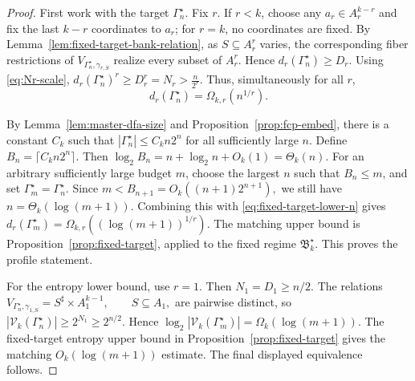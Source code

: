 \documentclass[11pt]{article}
\theoremstyle{definition}
\theoremstyle{remark}
\begin{document}
\begin{proof}
First work with the target \(\Gamma_n^\star\).
Fix \(r\).  If \(r<k\), choose any
\(a_r\in A_r^{k-r}\)
and fix the last \(k-r\) coordinates to \(a_r\); for \(r=k\), no coordinates
are fixed.  By Lemma~\ref{lem:fixed-target-bank-relation}, as
\(S\subseteq A_r^r\)
varies, the corresponding fiber restrictions of
\(V_{\Gamma_n^\star,\gamma_{r,S}}\) realize every subset of \(A_r^r\).
Hence
\(d_r(\Gamma_n^\star)\ge D_r.\)
Using \eqref{eq:Nr-scale},
\(d_r(\Gamma_n^\star)^r \ge D_r^r = N_r > \frac{n}{2^r}.\)
Thus, simultaneously for all \(r\),
\begin{equation}
\label{eq:fixed-target-lower-n}
d_r(\Gamma_n^\star)
=
\Omega_{k,r}(n^{1/r}).
\end{equation}

By Lemma~\ref{lem:master-dfa-size} and
Proposition~\ref{prop:fcp-embed}, there is a constant \(C_k\) such that
\(|\Gamma_n^\star| \le C_k n2^n\)
for all sufficiently large \(n\).  Define
\(B_n=\lceil C_k n2^n\rceil.\)
Then
\(\log_2 B_n = n+\log_2 n+O_k(1) = \Theta_k(n).\)
For an arbitrary sufficiently large budget \(m\), choose the largest \(n\)
such that \(B_n\le m\), and set
\(\Gamma_m^\star=\Gamma_n^\star.\)
Since
\(m<B_{n+1} = O_k((n+1)2^{n+1}),\)
we still have
\(n=\Theta_k(\log(m+1)).\)
Combining this with \eqref{eq:fixed-target-lower-n} gives
\(d_r(\Gamma_m^\star) = \Omega_{k,r} \!\left((\log(m+1))^{1/r}\right).\)
The matching upper bound is Proposition~\ref{prop:fixed-target}, applied to
the fixed regime \(\mathfrak B_k^\star\).  This proves the profile statement.

For the entropy lower bound, use \(r=1\).  Then
\(N_1=D_1\ge n/2.\)
The relations
\(V_{\Gamma_n^\star,\gamma_{1,S}} = S^\sharp\times A_1^{k-1}, \qquad S\subseteq A_1,\)
are pairwise distinct, so
\(|\mathcal V_k(\Gamma_n^\star)| \ge 2^{N_1} \ge 2^{n/2}.\)
Hence
\(\log_2|\mathcal V_k(\Gamma_m^\star)| = \Omega_k(\log(m+1)).\)
The fixed-target entropy upper bound in
Proposition~\ref{prop:fixed-target} gives the matching
\(O_k(\log(m+1))\) estimate.  The final displayed equivalence follows.
\end{proof}
\end{document}
